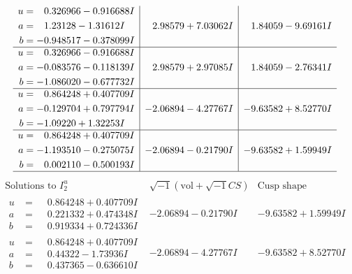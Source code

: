 \documentclass[1p]{elsarticle_modified}
\theoremstyle{definition}
\newcommand{\I}{\sqrt{-1}}
\begin{document}
$$\begin{array}{c|c|c}
\begin{aligned}
u &= \phantom{-}0.326966 - 0.916688 I \\
a &= \phantom{-}1.23128 - 1.31612 I \\
b &= -0.948517 - 0.378099 I\end{aligned}
 & \phantom{-}2.98579 + 7.03062 I & \phantom{-}1.84059 - 9.69161 I \\ \hline\begin{aligned}
u &= \phantom{-}0.326966 - 0.916688 I \\
a &= -0.083576 - 0.118139 I \\
b &= -1.086020 - 0.677732 I\end{aligned}
 & \phantom{-}2.98579 + 2.97085 I & \phantom{-}1.84059 - 2.76341 I \\ \hline\begin{aligned}
u &= \phantom{-}0.864248 + 0.407709 I \\
a &= -0.129704 + 0.797794 I \\
b &= -1.09220 + 1.32253 I\end{aligned}
 & -2.06894 - 4.27767 I & -9.63582 + 8.52770 I \\ \hline\begin{aligned}
u &= \phantom{-}0.864248 + 0.407709 I \\
a &= -1.193510 - 0.275075 I \\
b &= \phantom{-}0.002110 - 0.500193 I\end{aligned}
 & -2.06894 - 0.21790 I & -9.63582 + 1.59949 I\\
 \hline 
 \end{array}$$\newpage$$\begin{array}{c|c|c}  
\text{Solutions to }I^u_{2}& \I (\text{vol} + \sqrt{-1}CS) & \text{Cusp shape}\\
 \hline 
\begin{aligned}
u &= \phantom{-}0.864248 + 0.407709 I \\
a &= \phantom{-}0.221332 + 0.474348 I \\
b &= \phantom{-}0.919334 + 0.724336 I\end{aligned}
 & -2.06894 - 0.21790 I & -9.63582 + 1.59949 I \\ \hline\begin{aligned}
u &= \phantom{-}0.864248 + 0.407709 I \\
a &= \phantom{-}0.44322 - 1.73936 I \\
b &= \phantom{-}0.437365 - 0.636610 I\end{aligned}
 & -2.06894 - 4.27767 I & -9.63582 + 8.52770 I \\ \hline\begin{aligned}

\end{aligned}
\end{array}$$
\end{document}
